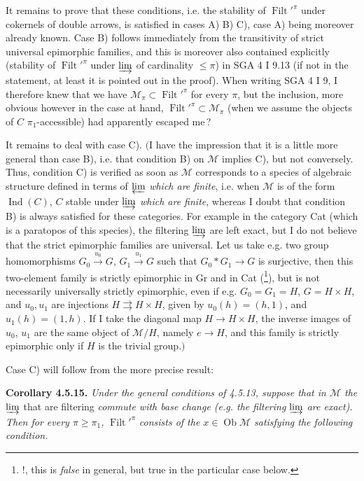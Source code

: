 \documentclass[11pt]{article}
\newcommand{\msp}[1]{\marginpar{\footnotesize [#1]}}
\newcommand{\Filt}{\operatorname{Filt}}
\newcommand{\Ob}{\operatorname{Ob}}
\newcommand{\Ind}{\operatorname{Ind}}
\begin{document}
It remains to prove that these conditions, i.e. the stability of $\Filt'^{\pi}$ under cokernels of double arrows, is satisfied in cases A) B) C), case A) being moreover already known. Case B) follows immediately from the transitivity of strict universal epimorphic families, and this is moreover also contained explicitly (stability of $\Filt'^{\pi}$ under $\varinjlim$ of cardinality $\leqslant \pi$) in SGA 4 I 9.13 (if not in the statement, at least it is pointed out in the proof). When writing SGA 4 I 9, I therefore knew that we have $\mathcal{M}_{\pi} \subset \Filt'^{\pi}$ for every $\pi$, but the inclusion, more obvious however in the case at hand, $\Filt'^{\pi} \subset \mathcal{M}_{\pi}$ (when we assume the objects of $C$ $\pi_1$-accessible) had apparently escaped me\,?

It remains to deal with case C). $\Big($I have the impression that it is a little more general than case B), i.e. that condition B) on $\mathcal{M}$ implies C), but not conversely. Thus, condition C) is verified as soon as $\mathcal{M}$ corresponds to a species of algebraic structure defined in
\msp{page 135}
terms of $\varprojlim$ \textit{which are finite}, i.e. when $\mathcal{M}$ is of the form $\Ind(C)$, $C$ stable under $\varinjlim$ \textit{which are finite}, whereas I doubt that condition B) is always satisfied for these categories. For example in the category Cat (which is a paratopos of this species), the filtering $\varinjlim$ are left exact, but I do not believe that the strict epimorphic families are universal. %
Let us take e.g. two group homomorphisms $G_0 \xrightarrow{u_0} G$, $G_1 \xrightarrow{u_1} G$ such that $G_0 * G_1 \longrightarrow G$ is surjective, then this two-element family is strictly epimorphic in Gr and in Cat (\footnote{!, this is \textit{false} in general, but true in the particular case below.}), but is not necessarily universally strictly epimorphic, even if e.g. $G_0 = G_1 = H$, $G = H \times H$, and $u_0, u_1$ are injections $H \rightrightarrows H \times H$, given by $u_0(h) = (h,1)$, and $u_1(h) = (1,h)$. If I take the diagonal map $H \longrightarrow H \times H$, the inverse images of $u_0$, $u_1$ are the same object of $\mathcal{M}/H$, namely $e \longrightarrow H$, and this family is strictly epimorphic only if $H$ is the trivial group.$\Big)$

Case C) will follow from the more precise result:

\textbf{Corollary 4.5.15.} \textit{Under the general conditions of 4.5.13, suppose that in $\mathcal{M}$ the} $\varinjlim$
\msp{page 136}
that are filtering \textit{commute with base change (e.g. the filtering} $\varinjlim$ \textit{are exact). Then for every $\pi \geqslant \pi_1$,} $\Filt'^{\pi}$ \textit{consists of the $x \in \Ob \mathcal{M}$ satisfying the following condition.}
\end{document}
